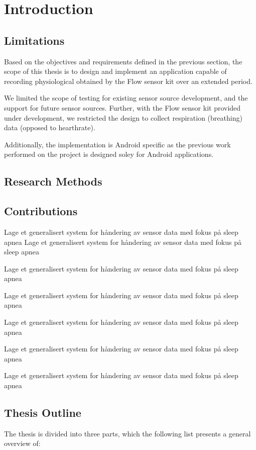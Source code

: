 \chapter{Introduction}\label{introduction}




\section{Limitations}
Based on the objectives and requirements defined in the previous section, the scope of this thesis is to design and implement an application capable of recording physiological obtained by the Flow sensor kit over an extended period. 

We limited the scope of testing for existing sensor source development, and the support for future sensor sources. Further, with the Flow sensor kit provided under development, we restricted the design to collect respiration (breathing) data (opposed to hearthrate).

Additionally, the implementation is Android specific as the previous work performed on the project is designed soley for Android applications. 

\section{Research Methods}

\section{Contributions}
Lage et generalisert system for håndering av sensor data med fokus på sleep apnea
Lage et generalisert system for håndering av sensor data med fokus på sleep apnea

Lage et generalisert system for håndering av sensor data med fokus på sleep apnea

Lage et generalisert system for håndering av sensor data med fokus på sleep apnea

Lage et generalisert system for håndering av sensor data med fokus på sleep apnea

Lage et generalisert system for håndering av sensor data med fokus på sleep apnea

Lage et generalisert system for håndering av sensor data med fokus på sleep apnea


\section{Thesis Outline}
The thesis is divided into three parts, which the following list presents a general overview of:

